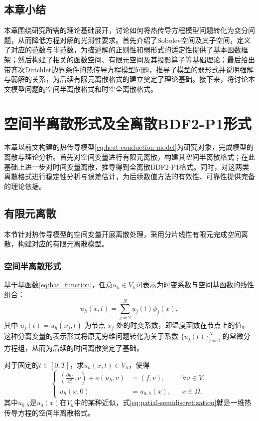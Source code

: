 \documentclass{GZUbachelorthesis}
\theoremstyle{chineseplain}
\begin{document}
\subsection{本章小结}
本章围绕研究所需的理论基础展开，讨论如何将热传导方程模型问题转化为变分问题，从而降低方程对解的光滑性要求。首先介绍了Sobolev空间及其子空间，定义了对应的范数与半范数，为描述解的正则性和弱形式的适定性提供了基本函数框架；然后构建了相关的函数空间、有限元空间及其投影算子等基础理论；最后给出带齐次Dirichlet边界条件的热传导方程模型问题，推导了模型的弱形式并说明强解与弱解的关系，为后续有限元离散格式的建立奠定了理论基础。接下来，将讨论本文模型问题的空间半离散格式和时空全离散格式。
\newpage
\section{空间半离散形式及全离散BDF2-P1形式}
本章以前文构建的热传导模型\eqref{eq:heat-conduction-model}为研究对象，完成模型的离散与理论分析。首先对空间变量进行有限元离散，构建其空间半离散格式；在此基础上进一步对时间变量离散，推导得到全离散BDF2-P1格式。同时，对这两类离散格式进行稳定性分析与误差估计，为后续数值方法的有效性、可靠性提供完备的理论依据。
\subsection{有限元离散}
本节针对热传导模型的空间变量开展离散处理，采用分片线性有限元完成空间离散，构建对应的有限元离散模型。
\subsubsection{空间半离散形式}
基于基函数\eqref{eq:hat_function}，任意$u_h \in V_h$可表示为时变系数与空间基函数的线性组合：
\[
u_h(x,t) = \sum_{j=2}^{N} u_j(t) \phi_j(x),
\]
其中 $u_j(t) = u_h(x_j,t)$ 为节点 $x_j$ 处的时变系数，即温度函数在节点上的值。这种分离变量的表示形式将原无穷维问题转化为关于系数 $\{u_j(t)\}_{j=2}^{N}$ 的常微分方程组，从而为后续的时间离散奠定了基础。

对于固定的$t \in [0,T]$，求$u_h(x,t) \in V_h$，使得
\begin{equation}
	\label{eq:patial-semidiscretization}
	\left\{
	\begin{aligned}
		\left( \frac{\partial u_h}{\partial t}, v \right) +  a(u_h,v) &= (f, v), && \forall v \in V, \\
		u_h(x,0) &= u_{0,h}(x), && x \in \Omega,
	\end{aligned}
	\right.
\end{equation}
其中$u_{0,h}$是$u_0(x)$在$V_h$中的某种近似，式\eqref{eq:patial-semidiscretization}就是一维热传导方程的空间半离散格式。
\end{document}

